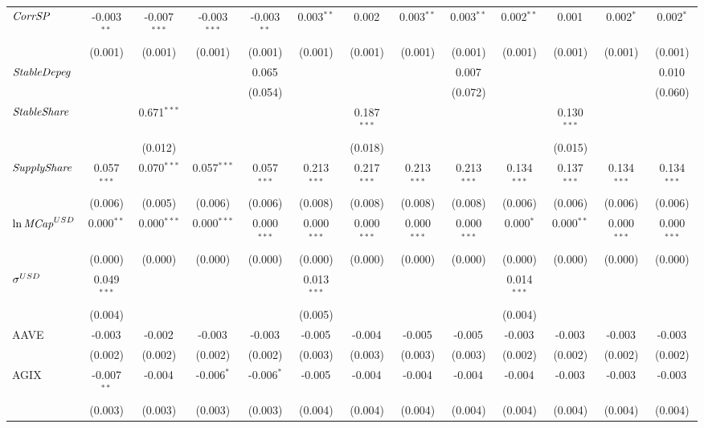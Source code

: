 \begin{table}[!htbp]
\begin{tabular}{@{\extracolsep{5pt}}lcccccccccccc}
 ${\it CorrSP}$ & -0.003$^{**}$ & -0.007$^{***}$ & -0.003$^{***}$ & -0.003$^{**}$ & 0.003$^{**}$ & 0.002$^{}$ & 0.003$^{**}$ & 0.003$^{**}$ & 0.002$^{**}$ & 0.001$^{}$ & 0.002$^{*}$ & 0.002$^{*}$ \\
  & (0.001) & (0.001) & (0.001) & (0.001) & (0.001) & (0.001) & (0.001) & (0.001) & (0.001) & (0.001) & (0.001) & (0.001) \\
 ${\it StableDepeg}$ & & & & 0.065$^{}$ & & & & 0.007$^{}$ & & & & 0.010$^{}$ \\
  & & & & (0.054) & & & & (0.072) & & & & (0.060) \\
 ${\it StableShare}$ & & 0.671$^{***}$ & & & & 0.187$^{***}$ & & & & 0.130$^{***}$ & & \\
  & & (0.012) & & & & (0.018) & & & & (0.015) & & \\
 ${\it SupplyShare}$ & 0.057$^{***}$ & 0.070$^{***}$ & 0.057$^{***}$ & 0.057$^{***}$ & 0.213$^{***}$ & 0.217$^{***}$ & 0.213$^{***}$ & 0.213$^{***}$ & 0.134$^{***}$ & 0.137$^{***}$ & 0.134$^{***}$ & 0.134$^{***}$ \\
  & (0.006) & (0.005) & (0.006) & (0.006) & (0.008) & (0.008) & (0.008) & (0.008) & (0.006) & (0.006) & (0.006) & (0.006) \\
 ${\it \ln MCap}^{USD}$ & 0.000$^{**}$ & 0.000$^{***}$ & 0.000$^{***}$ & 0.000$^{***}$ & 0.000$^{***}$ & 0.000$^{***}$ & 0.000$^{***}$ & 0.000$^{***}$ & 0.000$^{*}$ & 0.000$^{**}$ & 0.000$^{***}$ & 0.000$^{***}$ \\
  & (0.000) & (0.000) & (0.000) & (0.000) & (0.000) & (0.000) & (0.000) & (0.000) & (0.000) & (0.000) & (0.000) & (0.000) \\
 ${\it \sigma}^{USD}$ & 0.049$^{***}$ & & & & 0.013$^{***}$ & & & & 0.014$^{***}$ & & & \\
  & (0.004) & & & & (0.005) & & & & (0.004) & & & \\
 AAVE & -0.003$^{}$ & -0.002$^{}$ & -0.003$^{}$ & -0.003$^{}$ & -0.005$^{}$ & -0.004$^{}$ & -0.005$^{}$ & -0.005$^{}$ & -0.003$^{}$ & -0.003$^{}$ & -0.003$^{}$ & -0.003$^{}$ \\
  & (0.002) & (0.002) & (0.002) & (0.002) & (0.003) & (0.003) & (0.003) & (0.003) & (0.002) & (0.002) & (0.002) & (0.002) \\
 AGIX & -0.007$^{**}$ & -0.004$^{}$ & -0.006$^{*}$ & -0.006$^{*}$ & -0.005$^{}$ & -0.004$^{}$ & -0.004$^{}$ & -0.004$^{}$ & -0.004$^{}$ & -0.003$^{}$ & -0.003$^{}$ & -0.003$^{}$ \\
  & (0.003) & (0.003) & (0.003) & (0.003) & (0.004) & (0.004) & (0.004) & (0.004) & (0.004) & (0.004) & (0.004) & (0.004) \\

\end{tabular}
\end{table}
